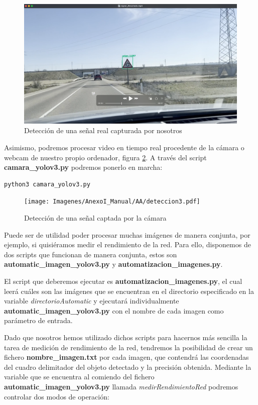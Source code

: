 \begin{figure}[H]
	\centering
	\includegraphics[width=\textwidth]{Imagenes/AnexoI_Manual/AA/deteccion2.pdf}
	\caption{Detección de una señal real capturada por nosotros}
	\label{detecc2}
\end{figure}

Asimismo, podremos procesar video en tiempo real procedente de la cámara o webcam de nuestro propio ordenador, figura \ref{detecc3}. A través del script \textbf{camara_yolov3.py} podremos ponerlo en marcha:

\begin{lstlisting}
python3 camara_yolov3.py
\end{lstlisting}

\begin{figure}[H]
	\centering
	\texttt{[image: Imagenes/AnexoI\_Manual/AA/deteccion3.pdf]}
	\caption{Detección de una señal captada por la cámara}
	\label{detecc3}
\end{figure}

Puede ser de utilidad poder procesar muchas imágenes de manera conjunta, por ejemplo, si quisiéramos medir el rendimiento de la red. Para ello, disponemos de dos scripts que funcionan de manera conjunta, estos son \textbf{automatic_imagen_yolov3.py} y \textbf{automatizacion_imagenes.py}. 

El script que deberemos ejecutar es \textbf{automatizacion_imagenes.py}, el cual leerá cuáles son las imágenes que se encuentran en el directorio especificado en la variable \textit{directorioAutomatic} y ejecutará individualmente \textbf{automatic_imagen_yolov3.py} con el nombre de cada imagen como parámetro de entrada.

Dado que nosotros hemos utilizado dichos scripts para hacernos más sencilla la tarea de medición de rendimiento de la red, tendremos la posibilidad de crear un fichero \textbf{nombre_imagen.txt} por cada imagen, que contendrá las coordenadas del cuadro delimitador del objeto detectado y la precisión obtenida. Mediante la variable que se encuentra al comiendo del fichero \textbf{automatic_imagen_yolov3.py} llamada \textit{medirRendimientoRed} podremos controlar dos modos de operación:

